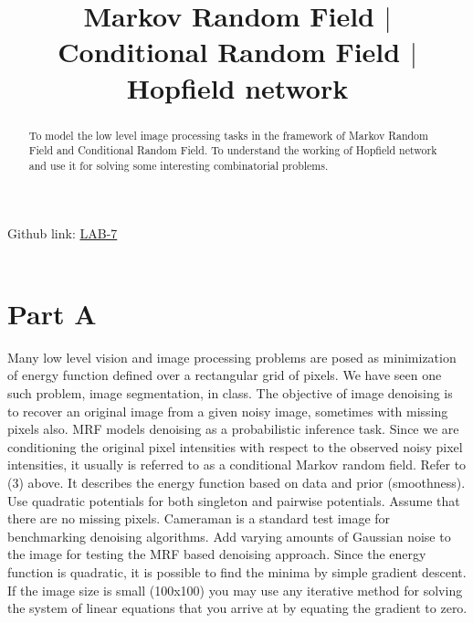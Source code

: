 \documentclass[conference]{IEEEtran}
\begin{document}
\title{Markov Random Field $|$ Conditional Random Field $|$ Hopfield network}
\author{
\and
{}
\and
{}
\and
{}
}
\maketitle
\setlength{\parindent}{20pt}
\noindent Github link: \href{https://github.com/JARVIS-codebase/LAB-7}{LAB-7} \\ \\ 
\indent \begin{abstract}
To model the low level image processing tasks in the framework of Markov Random Field and Conditional Random Field. To understand the working
of Hopfield network and use it for solving some interesting combinatorial problems.
\end{abstract}
\IEEEpeerreviewmaketitle

\section{Part A}
Many low level vision and image processing problems are
posed as minimization of energy function defined over a
rectangular grid of pixels. We have seen one such problem,
image segmentation, in class. The objective of image denoising
is to recover an original image from a given noisy image,
sometimes with missing pixels also. MRF models denoising
as a probabilistic inference task. Since we are conditioning the
original pixel intensities with respect to the observed noisy
pixel intensities, it usually is referred to as a conditional
Markov random field. Refer to (3) above. It describes the
energy function based on data and prior (smoothness). Use
quadratic potentials for both singleton and pairwise potentials.
Assume that there are no missing pixels. Cameraman is a
standard test image for benchmarking denoising algorithms.
Add varying amounts of Gaussian noise to the image for
testing the MRF based denoising approach. Since the energy
function is quadratic, it is possible to find the minima by
simple gradient descent. If the image size is small (100x100)
you may use any iterative method for solving the system of
linear equations that you arrive at by equating the gradient to
zero.
\end{document}
